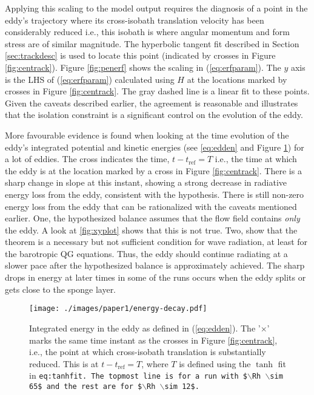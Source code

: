 Applying this scaling to the model output requires the diagnosis of a point in the eddy's trajectory where its cross-isobath translation velocity has been considerably reduced i.e., this isobath is where angular momentum and form stress are of similar magnitude. The hyperbolic tangent fit described in Section \ref{sec:trackdesc} is used to locate this point (indicated by crosses in Figure \ref{fig:centrack}). Figure \ref{fig:penerf} shows the scaling in (\ref{eq:erfparam}). The $y$ axis is the LHS of (\ref{eq:erfparam}) calculated using $H$ at the locations marked by crosses in Figure \ref{fig:centrack}. The gray dashed line is a linear fit to these points. Given the caveats described earlier, the agreement is reasonable and illustrates that the isolation constraint is a significant control on the evolution of the eddy.

More favourable evidence is found when looking at the time evolution of the eddy's integrated potential and kinetic energies (see \ref{eq:edden} and Figure \ref{fig:energy}) for a lot of eddies. The cross indicates the time, $t-t_\text{ref} = T$ i.e., the time at which the eddy is at the location marked by a cross in Figure \ref{fig:centrack}. There is a sharp change in slope at this instant, showing a strong decrease in radiative energy loss from the eddy, consistent with the hypothesis. There is still non-zero energy loss from the eddy that can be rationalized with the caveats mentioned earlier. One, the hypothesized balance assumes that the flow field contains \emph{only} the eddy. A look at \ref{fig:xyplot} shows that this is not true. Two, \cite{Flierl1983} show that the theorem is a necessary but not sufficient condition for wave radiation, at least for the barotropic QG equations. Thus, the eddy should continue radiating at a slower pace after the hypothesized balance is approximately achieved. The sharp drops in energy at later times in some of the runs occurs when the eddy splits or gets close to the sponge layer.

\begin{figure}[htb]
\centering
\texttt{[image: ./images/paper1/energy-decay.pdf]}
\caption{\label{fig:energy}Integrated energy in the eddy as defined in (\ref{eq:edden}). The '$\times$' marks the same time instant as the crosses in Figure \ref{fig:centrack}, i.e., the point at which cross-isobath translation is substantially reduced. This is at $t - t_\text{ref}=T$, where $T$ is defined using the $\tanh$ fit in \texttt{eq:tanhfit. The topmost line is for a run with \$$\backslash$Rh $\backslash$sim 65\$ and the rest are for \$$\backslash$Rh $\backslash$sim 12\$.}}
\end{figure}

